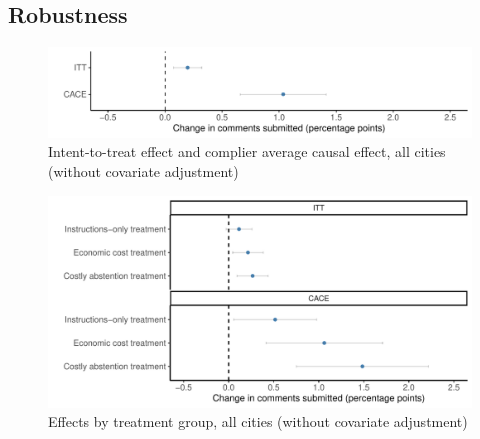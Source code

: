 \documentclass[12pt,final,fleqn]{article}
\theoremstyle{plain}
\begin{document}

\label{tab: itt}

\clearpage

\label{tab: cace}






\clearpage

\label{tab: cate}


\label{tab: disc}


\clearpage
\pagebreak
\subsection{Robustness} \label{sec: robustness}

\begin{figure}[!htb]
\includegraphics[width = \textwidth]{../figs/fgA6.pdf}
\caption{Intent-to-treat effect and complier average causal effect, all cities (without covariate adjustment)}
\label{fig: treatment_placebo_nocovs}
\end{figure}

\begin{figure}[H]
\includegraphics[width = \textwidth]{../figs/fgA7.pdf}
\caption{Effects by treatment group, all cities (without covariate adjustment)}
\label{fig: all_treatments_nocovs}
\end{figure}
\end{document}
